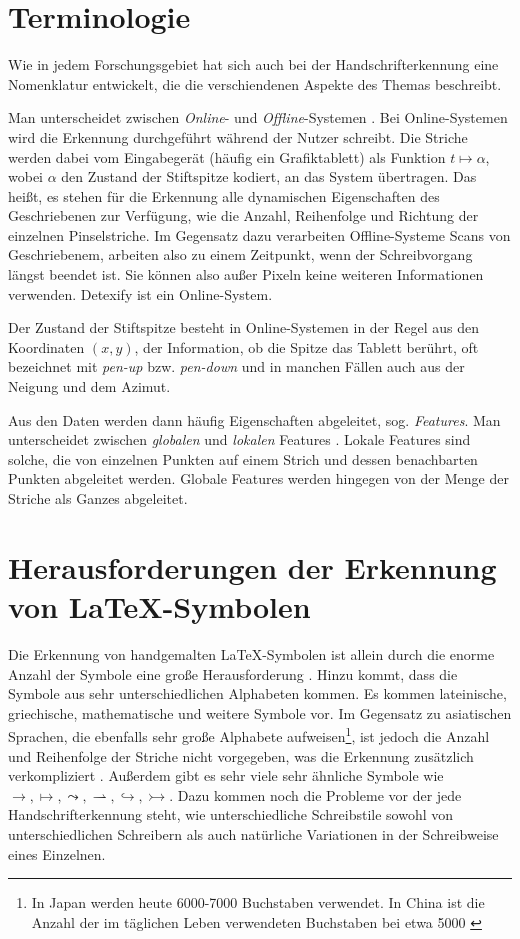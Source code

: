 \section{Terminologie} %
\label{sec:terminologie}

Wie in jedem Forschungsgebiet hat sich auch bei der Handschrifterkennung eine Nomenklatur entwickelt, die die verschiendenen Aspekte des Themas beschreibt.

Man unterscheidet zwischen \emph{Online}- und \emph{Offline}-Systemen \cite{Tappert:1990p10302}. Bei Online-Systemen wird die Erkennung durchgeführt während der Nutzer schreibt. Die Striche werden dabei vom Eingabegerät (häufig ein Grafiktablett) als Funktion $ t \mapsto \alpha $, wobei $\alpha$ den Zustand der Stiftspitze kodiert, an das System übertragen. Das heißt, es stehen für die Erkennung alle dynamischen Eigenschaften des Geschriebenen zur Verfügung, wie die Anzahl, Reihenfolge und Richtung der einzelnen Pinselstriche. Im Gegensatz dazu verarbeiten Offline-Systeme Scans von Geschriebenem, arbeiten also zu einem Zeitpunkt, wenn der Schreibvorgang längst beendet ist. Sie können also außer Pixeln keine weiteren Informationen verwenden.
Detexify ist ein Online-System.

Der Zustand der Stiftspitze besteht in Online-Systemen in der Regel aus den Koordinaten $(x,y)$, der Information, ob die Spitze das Tablett berührt, oft bezeichnet mit \emph{pen-up} bzw. \emph{pen-down} und in manchen Fällen auch aus der Neigung und dem Azimut.

Aus den Daten werden dann häufig Eigenschaften abgeleitet, sog. \emph{Features}. Man unterscheidet zwischen \emph{globalen} und \emph{lokalen} Features \cite{Tapia:2007p9160}. Lokale Features sind solche, die von einzelnen Punkten auf einem Strich und dessen benachbarten Punkten abgeleitet werden. Globale Features werden hingegen von der Menge der Striche als Ganzes abgeleitet.

\section[Herausforderungen]{Herausforderungen der Erkennung von \LaTeX-Symbolen}
Die Erkennung von handgemalten \LaTeX-Symbolen ist allein durch die enorme Anzahl der Symbole eine große Herausforderung \cite{Koerich:2003p1562}. Hinzu kommt, dass die Symbole aus sehr unterschiedlichen Alphabeten kommen. Es kommen lateinische, griechische, mathematische und weitere Symbole vor. Im Gegensatz zu asiatischen Sprachen, die ebenfalls sehr große Alphabete aufweisen\footnote{In Japan werden heute 6000-7000 Buchstaben verwendet. In China ist die Anzahl der im täglichen Leben verwendeten Buchstaben bei etwa 5000 \cite{Jaeger:2003p1097}}, ist jedoch die Anzahl und Reihenfolge der Striche nicht vorgegeben, was die Erkennung zusätzlich verkompliziert \cite{Watt:2005p1816}. Außerdem gibt es sehr viele sehr ähnliche Symbole wie $\rightarrow,\mapsto,\leadsto,\rightharpoonup,\hookrightarrow,\rightarrowtail$. Dazu kommen noch die Probleme vor der jede Handschrifterkennung steht, wie unterschiedliche Schreibstile sowohl von unterschiedlichen Schreibern als auch natürliche Variationen in der Schreibweise eines Einzelnen.

